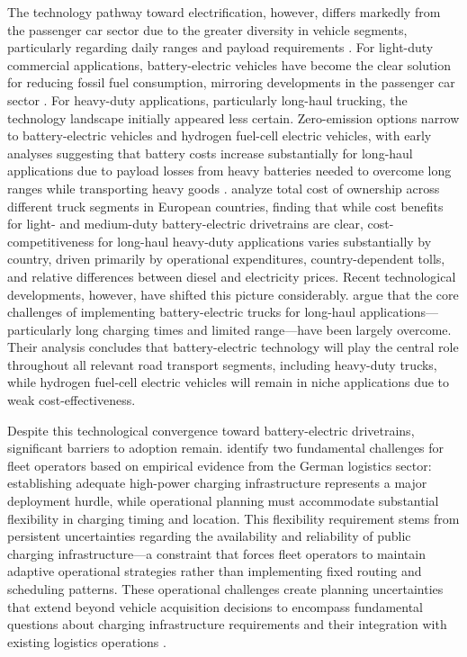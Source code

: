         The technology pathway toward electrification, however, differs markedly from the passenger car sector due to the greater diversity in vehicle segments, particularly regarding daily ranges and payload requirements \citep{BAEK2026100512, NOLL2022118079}. For light-duty commercial applications, battery-electric vehicles have become the clear solution for reducing fossil fuel consumption, mirroring developments in the passenger car sector \cite{IEA2024}. For heavy-duty applications, particularly long-haul trucking, the technology landscape initially appeared less certain. Zero-emission options narrow to battery-electric vehicles and hydrogen fuel-cell electric vehicles, with early analyses suggesting that battery costs increase substantially for long-haul applications due to payload losses from heavy batteries needed to overcome long ranges while transporting heavy goods \cite{MARTIN2023100156}. \citet{NOLL2022118079} analyze total cost of ownership across different truck segments in European countries, finding that while cost benefits for light- and medium-duty battery-electric drivetrains are clear, cost-competitiveness for long-haul heavy-duty applications varies substantially by country, driven primarily by operational expenditures, country-dependent tolls, and relative differences between diesel and electricity prices. Recent technological developments, however, have shifted this picture considerably. \citet{Plötz2022} argue that the core challenges of implementing battery-electric trucks for long-haul applications—particularly long charging times and limited range—have been largely overcome. Their analysis concludes that battery-electric technology will play the central role throughout all relevant road transport segments, including heavy-duty trucks, while hydrogen fuel-cell electric vehicles will remain in niche applications due to weak cost-effectiveness.
    
        Despite this technological convergence toward battery-electric drivetrains, significant barriers to adoption remain. \citet{Scherrer2024Requirements} identify two fundamental challenges for fleet operators based on empirical evidence from the German logistics sector: establishing adequate high-power charging infrastructure represents a major deployment hurdle, while operational planning must accommodate substantial flexibility in charging timing and location. This flexibility requirement stems from persistent uncertainties regarding the availability and reliability of public charging infrastructure—a constraint that forces fleet operators to maintain adaptive operational strategies rather than implementing fixed routing and scheduling patterns. These operational challenges create planning uncertainties that extend beyond vehicle acquisition decisions to encompass fundamental questions about charging infrastructure requirements and their integration with existing logistics operations \citep{XIAO2025105100, alam2025}.

